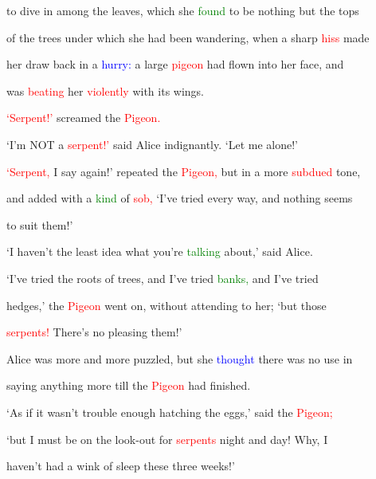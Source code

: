  to dive in among the leaves, which she \textcolor{green}{found} to be nothing but the \textcolor{BurntOrange}{tops}

 of the \textcolor{BurntOrange}{trees} under which she had been wandering, when a sharp \textcolor{red}{hiss} made

 her draw back in a \textcolor{blue}{hurry:} a large \textcolor{red}{pigeon} had flown into her face, and

 was \textcolor{red}{beating} her \textcolor{red}{violently} with its wings.



 \textcolor{red}{‘Serpent!’} \textcolor{BurntOrange}{screamed} the \textcolor{red}{Pigeon.}



 ‘I’m NOT a \textcolor{red}{serpent!’} said Alice indignantly. ‘Let me alone!’



 \textcolor{red}{‘Serpent,} I say again!’ repeated the \textcolor{red}{Pigeon,} but in a more \textcolor{red}{subdued} tone,

 and added with a \textcolor{green}{kind} of \textcolor{red}{sob,} ‘I’ve tried every way, and nothing seems

 to suit them!’



 ‘I haven’t the least idea what you’re \textcolor{green}{talking} about,’ said Alice.



 ‘I’ve tried the roots of \textcolor{BurntOrange}{trees,} and I’ve tried \textcolor{green}{banks,} and I’ve tried

 hedges,’ the \textcolor{red}{Pigeon} went on, without attending to her; ‘but those

 \textcolor{red}{serpents!} There’s no pleasing them!’



 Alice was more and more puzzled, but she \textcolor{blue}{thought} there was no use in

 saying anything more till the \textcolor{red}{Pigeon} had finished.



 ‘As if it wasn’t trouble enough hatching the eggs,’ said the \textcolor{red}{Pigeon;}

 ‘but I must be on the look-out for \textcolor{red}{serpents} night and day! Why, I

 haven’t had a wink of sleep these three weeks!’



